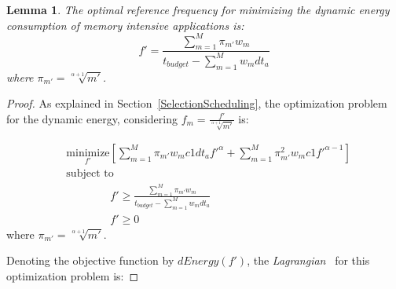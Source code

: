 \documentclass[11pt, letterpaper]{article}
\newtheorem{lemma}{Lemma}
\begin{document}
\begin{lemma}\label{DynamicOptimizer}
The optimal reference frequency for minimizing the dynamic energy consumption of memory intensive applications  is:
\begin{displaymath}
f' = \frac{\sum_{m=1}^{M}\pi_{m'}w_m}{t_{budget} - \sum_{m=1}^{M}w_mdt_a}
\end{displaymath}
where $\pi_{m'} =\sqrt[\alpha+1]{m'}$.
\end{lemma}
\begin{proof}
As explained in Section~\ref{SelectionScheduling}, the optimization problem for the dynamic energy, considering $f_m = \frac{f'}{\sqrt[\alpha+1]{m'}}$ is:

\begin{displaymath}
\begin{aligned} 
  &\underset{f'}{\text{minimize}}[\sum_{m=1}^{M}\pi_{m'}w_m c1dt_af'^{\alpha} + \sum_{m=1}^{M}\pi_{m'}^2 w_m c1f'^{\alpha-1}]\\
 & \text{subject to}\\
 & \qquad \qquad f' \geq \frac{\sum_{m=1}^{M}\pi_{m'}w_m}{t_{budget} - \sum_{m=1}^{M}w_mdt_a}\\
 &\qquad \qquad f' \geq 0
\end{aligned}
\end{displaymath}
where $\pi_{m'} =\sqrt[\alpha+1]{m'}$.

Denoting the objective function by $dEnergy(f')$, the \emph{Lagrangian}~\cite{Boyd} for this optimization problem is:


\end{proof}
\end{document}
